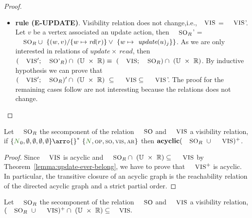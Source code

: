 \documentclass[envcountsect,runningheads,orivec]{llncs}
\begin{document}
\begin{proof}
\begin{itemize}
\begin{itemize}
			  \item{\bf rule (\textsc{E-UPDATE})}. Visibility relation does not change,i.e.,$\textsc{\small{VIS}}$ = $\textsc{\small{VIS}}$'. Let $v$ be a vertex associated an update action, then $\textsc{\small{SO}}_R$' = $\textsc{\small{SO}}_R \cup\ \{(w,v) / \{w \mapsto \readtran{r}\} \lor\ \{w \mapsto \ \updatebyclient{j}\} \}$. As we are only interested in relations of $update \times\ read$, then $(\textsc{\small{VIS}}';\textsc{\small{SO}'}_R) \cap \ (\mathbb{U}\ \times \ \mathbb{R}) \equiv \ (\textsc{\small{VIS}};\textsc{\small{SO}}_R) \cap \ (\mathbb{U}\ \times \ \mathbb{R})$. By inductive hypothesis we can prove that $(\textsc{\small{VIS}}';\textsc{\small{SO}}_R)' \cap \ (\mathbb{U}\ \times \ \mathbb{R}) \ \subseteq \ \textsc{\small{VIS}} \subseteq \ \textsc{\small{VIS}}$'.				
				The proof for the remaining cases follow are not interesting because the relations does not change.
\end{itemize}
\end{itemize}
\end{proof}



\begin{theorem}

Let $\textsc{\small{SO}}_R$ the se\cond component of the relation $\textsc{\small{SO}}$ and $\textsc{\small{VIS}}$ a visibility relation, if $\environment{\systemterm_0}{\emptyset}{\emptyset}{\emptyset}{\emptyset} \arro{} ^*\ \environment{\systemterm}{\op}{\so}{\vis}{\arb}$ then $\textbf{acyclic}(\textsc{\small{SO}}_R \ \cup \ \textsc{\small{VIS}} ) ^+$.

\end{theorem}

\begin{proof}

Since $\textsc{\small{VIS}}$ is acyclic and $\textsc{\small{SO}}_R \cap \ (\mathbb{U}\ \times \ \mathbb{R})  \subseteq \ \textsc{\small{VIS}}$ by Theorem~\ref{lemma:update-ever-belong}, we have to prove that $\textsc{\small{VIS}} ^+$ is acyclic. In particular, the transitive closure of an acyclic graph is the reachability relation of the directed acyclic graph and a strict partial order.

\end{proof}





\begin{theorem}

Let $\textsc{\small{SO}}_R$ the se\cond component of the relation $\textsc{\small{SO}}$ and $\textsc{\small{VIS}}$ a visibility relation, $(\textsc{\small{SO}}_R \ \cup \ \textsc{\small{VIS}} ) ^{+} \cap \ (\mathbb{U}\ \times \ \mathbb{R}) \subseteq \textsc{\small{VIS}}.$ 

\end{theorem}
 
\end{document}
